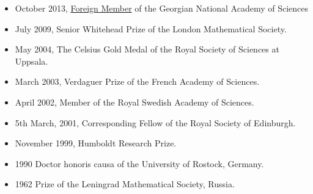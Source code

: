 \documentclass{article}
\begin{document}
\begin{itemize}

 \item October 2013,
  \href{http://www.science.org.ge/Documents/Diploma/Mazya.pdf}
  {Foreign Member}
  of the Georgian National Academy of Sciences
  \item July 2009,
                        {Senior Whitehead Prize of the London Mathematical Society}.
\item May 2004, The Celsius Gold Medal of the Royal Society of Sciences at Uppsala.

 \item  March 2003, Verdaguer Prize  of the
French Academy of Sciences.
\item April 2002, Member of the Royal
Swedish Academy of Sciences.
       \item 5th March, 2001, Corresponding
Fellow of the Royal Society of
  Edinburgh.
       \item November 1999, Humboldt Research
Prize.
        \item 1990 Doctor honoris causa of the
University of Rostock, Germany.
       \item 1962 Prize of the Leningrad
Mathematical Society, Russia.
\end{itemize}

\medskip
\end{document}
